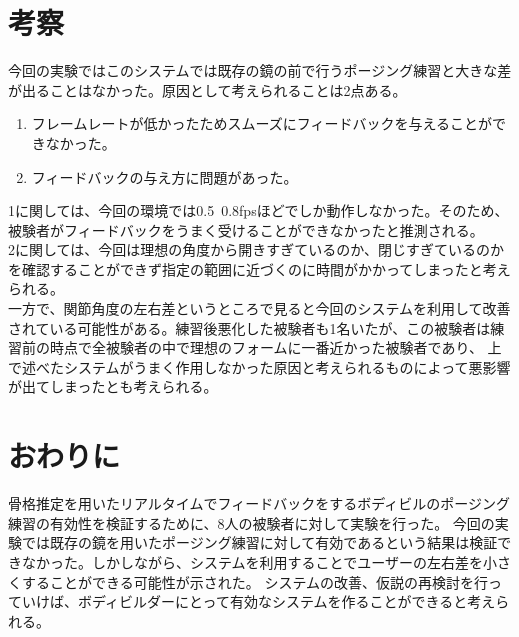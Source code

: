 \documentclass[a4j,10pt]{jsarticle}
\begin{document}
\section{考察}
今回の実験ではこのシステムでは既存の鏡の前で行うポージング練習と大きな差が出ることはなかった。原因として考えられることは2点ある。
\begin{enumerate}
    \item フレームレートが低かったためスムーズにフィードバックを与えることができなかった。
    \item フィードバックの与え方に問題があった。
\end{enumerate}
1に関しては、今回の環境では0.5~0.8fpsほどでしか動作しなかった。そのため、
被験者がフィードバックをうまく受けることができなかったと推測される。\\
2に関しては、今回は理想の角度から開きすぎているのか、閉じすぎているのかを確認することができず指定の範囲に近づくのに時間がかかってしまったと考えられる。\\
一方で、関節角度の左右差というところで見ると今回のシステムを利用して改善されている可能性がある。練習後悪化した被験者も1名いたが、この被験者は練習前の時点で全被験者の中で理想のフォームに一番近かった被験者であり、
上で述べたシステムがうまく作用しなかった原因と考えられるものによって悪影響が出てしまったとも考えられる。
\section{おわりに}
骨格推定を用いたリアルタイムでフィードバックをするボディビルのポージング練習の有効性を検証するために、8人の被験者に対して実験を行った。
今回の実験では既存の鏡を用いたポージング練習に対して有効であるという結果は検証できなかった。しかしながら、システムを利用することでユーザーの左右差を小さくすることができる可能性が示された。
システムの改善、仮説の再検討を行っていけば、ボディビルダーにとって有効なシステムを作ることができると考えられる。



\end{document}
